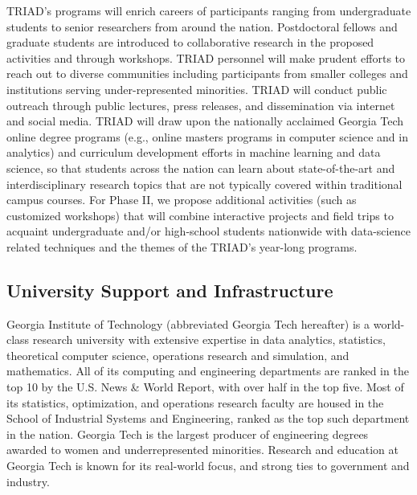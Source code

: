 \documentclass[12pt]{article}
\begin{document}
TRIAD's programs will enrich careers of participants ranging from undergraduate students to senior researchers from around the nation.
Postdoctoral fellows and graduate students are introduced to collaborative research in the proposed activities and through workshops.
TRIAD personnel will make prudent efforts to reach out to diverse communities including
participants from smaller colleges and institutions serving under-represented minorities.
TRIAD will conduct public outreach through public lectures, press releases, and dissemination via internet and social media.
TRIAD will draw upon the nationally acclaimed Georgia Tech online degree programs (e.g., online
masters programs in computer science and in analytics) and curriculum development efforts in
machine learning and data science, so that students across the nation can learn about state-of-the-art and interdisciplinary research topics that are not typically covered within traditional campus courses.
For Phase II, we propose additional activities (such as customized workshops) that will combine
interactive projects and field trips to acquaint undergraduate and/or high-school students
nationwide with data-science related techniques and the themes of the TRIAD's year-long programs.


\vspace*{-1em}
\subsection{University Support and Infrastructure}
Georgia Institute of Technology (abbreviated Georgia Tech hereafter) is a world-class research university with extensive expertise in data analytics, statistics, theoretical
computer science, operations research and simulation, and mathematics.
All of its computing and engineering departments are ranked in the top 10 by the
U.S. News \& World Report, with over half in the top five. Most of its statistics, optimization,
and operations research faculty are housed in the School of Industrial Systems and Engineering,
ranked as the top such department in the nation. Georgia Tech is the largest producer of engineering degrees awarded to women and underrepresented minorities. Research and education
at Georgia Tech is known for its real-world focus, and strong ties to government and industry.
\end{document}
